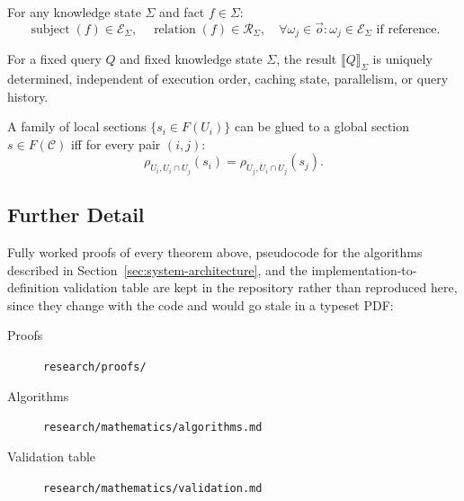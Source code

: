 \begin{theorem}
\label{thm:integrity}
For any knowledge state $\Sigma$ and fact $f \in \Sigma$:
\[
\operatorname{subject}(f) \in \mathcal{E}_\Sigma,\quad
\operatorname{relation}(f) \in \mathcal{R}_\Sigma,\quad
\forall \omega_j \in \vec{o}: \omega_j \in \mathcal{E}_\Sigma \text{ if reference}.
\]
\end{theorem}

\begin{theorem}
\label{thm:determinism}
For a fixed query $Q$ and fixed knowledge state $\Sigma$,
the result $\llbracket Q \rrbracket_\Sigma$ is uniquely determined,
independent of execution order, caching state, parallelism, or query history.
\end{theorem}

\begin{theorem}
\label{thm:global}
A family of local sections $\{s_i \in F(U_i)\}$ can be glued to a global section
$s \in F(\mathcal{C})$ iff for every pair $(i,j)$:
\[
\rho_{U_i, U_i \cap U_j}(s_i) = \rho_{U_j, U_i \cap U_j}(s_j).
\]
\end{theorem}

\subsection{Further Detail}
\label{sec:appendix:further}

Fully worked proofs of every theorem above, pseudocode for the
algorithms described in Section~\ref{sec:system-architecture}, and the
implementation-to-definition validation table are kept in the repository
rather than reproduced here, since they change with the code and would
go stale in a typeset PDF:

\begin{description}
    \item[Proofs] \texttt{research/proofs/}
    \item[Algorithms] \texttt{research/mathematics/algorithms.md}
    \item[Validation table] \texttt{research/mathematics/validation.md}
\end{description}
